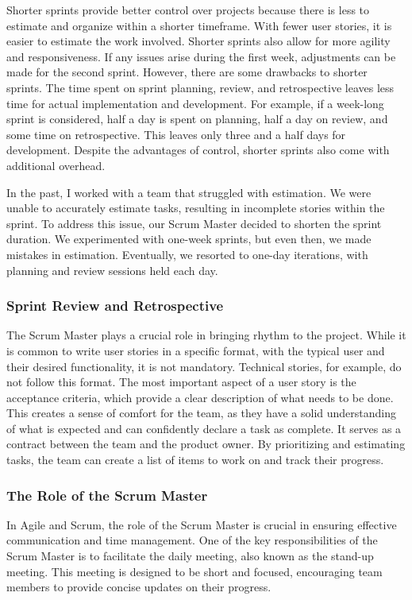 Shorter sprints provide better control over projects because there is
less to estimate and organize within a shorter timeframe. With fewer
user stories, it is easier to estimate the work involved. Shorter
sprints also allow for more agility and responsiveness. If any issues
arise during the first week, adjustments can be made for the second
sprint. However, there are some drawbacks to shorter sprints. The time
spent on sprint planning, review, and retrospective leaves less time for
actual implementation and development. For example, if a week-long
sprint is considered, half a day is spent on planning, half a day on
review, and some time on retrospective. This leaves only three and a
half days for development. Despite the advantages of control, shorter
sprints also come with additional overhead.

In the past, I worked with a team that struggled with estimation. We
were unable to accurately estimate tasks, resulting in incomplete
stories within the sprint. To address this issue, our Scrum Master
decided to shorten the sprint duration. We experimented with one-week
sprints, but even then, we made mistakes in estimation. Eventually, we
resorted to one-day iterations, with planning and review sessions held
each day.

\subsubsection{Sprint Review and Retrospective}

The Scrum Master plays a crucial role in bringing rhythm to the project.
While it is common to write user stories in a specific format, with the
typical user and their desired functionality, it is not mandatory.
Technical stories, for example, do not follow this format. The most
important aspect of a user story is the acceptance criteria, which
provide a clear description of what needs to be done. This creates a
sense of comfort for the team, as they have a solid understanding of
what is expected and can confidently declare a task as complete. It
serves as a contract between the team and the product owner. By
prioritizing and estimating tasks, the team can create a list of items
to work on and track their progress.

\subsubsection{The Role of the Scrum Master}

In Agile and Scrum, the role of the Scrum Master is crucial in ensuring
effective communication and time management. One of the key
responsibilities of the Scrum Master is to facilitate the daily meeting,
also known as the stand-up meeting. This meeting is designed to be short
and focused, encouraging team members to provide concise updates on
their progress.

